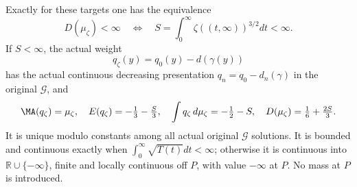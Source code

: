 \begin{theorem}\label{branch:radon}
Exactly for these targets one has the equivalence
\[
 D(\mu_\zeta)<\infty\quad\Longleftrightarrow\quad
 S=\int_0^\infty\zeta((t,\infty))^{3/2}dt<\infty.
\]
If $S<\infty$, the actual weight
\[
 q_\zeta(y)=q_0(y)-d(\gamma(y))
\]
has the actual continuous decreasing presentation
$q_n=q_0-d_n(\gamma)$ in the original $\mathcal G$, and
\[
 \MA(q_\zeta)=\mu_\zeta,\quad E(q_\zeta)=-\tfrac13-\tfrac S3,
 \quad\int q_\zeta\,d\mu_\zeta=-\tfrac12-S,
 \quad D(\mu_\zeta)=\tfrac16+\tfrac{2S}3.
\]
It is unique modulo constants among all actual original $\mathcal G$
solutions. It is bounded and continuous exactly when
$\int_0^\infty\sqrt{T(t)}dt<\infty$; otherwise it is continuous into
$\mathbb R\cup\{-\infty\}$, finite and locally continuous off $P$,
with value $-\infty$ at $P$. No mass at $P$ is introduced.
\end{theorem}
